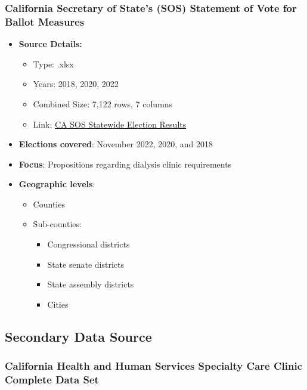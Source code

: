 \documentclass[
  11pt,
  letterpaper,
  DIV=11,
  numbers=noendperiod]{scrartcl}
\providecommand{\tightlist}{%
  \setlength{\itemsep}{0pt}\setlength{\parskip}{0pt}}\usepackage{longtable,booktabs,array}
\begin{document}
\subsubsection{California Secretary of State's (SOS) Statement of Vote
for Ballot
Measures}\label{california-secretary-of-states-sos-statement-of-vote-for-ballot-measures}

\begin{itemize}
\tightlist
\item
  \textbf{Source Details:}

  \begin{itemize}
  \tightlist
  \item
    Type: .xlsx
  \item
    Years: 2018, 2020, 2022
  \item
    Combined Size: 7,122 rows, 7 columns
  \item
    Link:
    \href{https://www.sos.ca.gov/elections/prior-elections/statewide-election-results}{CA
    SOS Statewide Election Results}
  \end{itemize}
\item
  \textbf{Elections covered}: November 2022, 2020, and 2018
\item
  \textbf{Focus}: Propositions regarding dialysis clinic requirements
\item
  \textbf{Geographic levels}:

  \begin{itemize}
  \tightlist
  \item
    Counties
  \item
    Sub-counties:

    \begin{itemize}
    \tightlist
    \item
      Congressional districts
    \item
      State senate districts
    \item
      State assembly districts
    \item
      Cities
    \end{itemize}
  \end{itemize}
\end{itemize}

\subsection{Secondary Data Source}\label{secondary-data-source}

\subsubsection{California Health and Human Services Specialty Care
Clinic Complete Data
Set}\label{california-health-and-human-services-specialty-care-clinic-complete-data-set}
\end{document}
